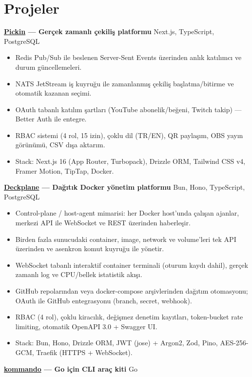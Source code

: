 \documentclass[10pt,a4paper]{extarticle}
\begin{document}
\section{Projeler}
\noindent\textbf{\href{https://pickin.co}{Pickin} — Gerçek zamanlı çekiliş platformu} \hfill Next.js, TypeScript, PostgreSQL\\
\begin{itemize}[leftmargin=*,noitemsep,topsep=0pt]
    \item Redis Pub/Sub ile beslenen Server-Sent Events üzerinden anlık katılımcı ve durum güncellemeleri.
    \item NATS JetStream iş kuyruğu ile zamanlanmış çekiliş başlatma/bitirme ve otomatik kazanan seçimi.
    \item OAuth tabanlı katılım şartları (YouTube abonelik/beğeni, Twitch takip) — Better Auth ile entegre.
    \item RBAC sistemi (4 rol, 15 izin), çoklu dil (TR/EN), QR paylaşım, OBS yayın görünümü, CSV dışa aktarım.
    \item Stack: Next.js 16 (App Router, Turbopack), Drizzle ORM, Tailwind CSS v4, Framer Motion, TipTap, Docker.
\end{itemize}
\noindent\textbf{\href{https://deckplane.com}{Deckplane} — Dağıtık Docker yönetim platformu} \hfill Bun, Hono, TypeScript, PostgreSQL\\
\begin{itemize}[leftmargin=*,noitemsep,topsep=0pt]
    \item Control-plane / host-agent mimarisi: her Docker host'unda çalışan ajanlar, merkezi API ile WebSocket ve REST üzerinden haberleşir.
    \item Birden fazla sunucudaki container, image, network ve volume'leri tek API üzerinden ve asenkron komut kuyruğu ile yönetir.
    \item WebSocket tabanlı interaktif container terminali (oturum kaydı dahil), gerçek zamanlı log ve CPU/bellek istatistik akışı.
    \item GitHub repolarından veya docker-compose arşivlerinden dağıtım otomasyonu; OAuth ile GitHub entegrasyonu (branch, secret, webhook).
    \item RBAC (4 rol), çoklu kiracılık, değişmez denetim kayıtları, token-bucket rate limiting, otomatik OpenAPI 3.0 + Swagger UI.
    \item Stack: Bun, Hono, Drizzle ORM, JWT (jose) + Argon2, Zod, Pino, AES-256-GCM, Traefik (HTTPS + WebSocket).
\end{itemize}
\noindent\textbf{\href{https://github.com/yigit433/kommando}{kommando} — Go için CLI araç kiti} \hfill Go\\
\end{document}
